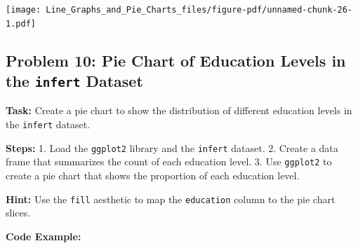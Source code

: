 \documentclass[
  letterpaper,
  DIV=11,
  numbers=noendperiod]{scrreprt}
\newenvironment{Shaded}{\begin{snugshade}}{\end{snugshade}}
\newcommand{\AttributeTok}[1]{\textcolor[rgb]{0.40,0.45,0.13}{#1}}
\newcommand{\CommentTok}[1]{\textcolor[rgb]{0.37,0.37,0.37}{#1}}
\newcommand{\DecValTok}[1]{\textcolor[rgb]{0.68,0.00,0.00}{#1}}
\newcommand{\FloatTok}[1]{\textcolor[rgb]{0.68,0.00,0.00}{#1}}
\newcommand{\FunctionTok}[1]{\textcolor[rgb]{0.28,0.35,0.67}{#1}}
\newcommand{\NormalTok}[1]{\textcolor[rgb]{0.00,0.23,0.31}{#1}}
\newcommand{\OtherTok}[1]{\textcolor[rgb]{0.00,0.23,0.31}{#1}}
\newcommand{\SpecialCharTok}[1]{\textcolor[rgb]{0.37,0.37,0.37}{#1}}
\newcommand{\StringTok}[1]{\textcolor[rgb]{0.13,0.47,0.30}{#1}}
\begin{document}
\texttt{[image: Line\_Graphs\_and\_Pie\_Charts\_files/figure-pdf/unnamed-chunk-26-1.pdf]}

\subsection*{\texorpdfstring{Problem 10: Pie Chart of Education Levels
in the \texttt{infert}
Dataset}{Problem 10: Pie Chart of Education Levels in the infert Dataset}}\label{problem-10-pie-chart-of-education-levels-in-the-infert-dataset}

\textbf{Task:} Create a pie chart to show the distribution of different
education levels in the \texttt{infert} dataset.

\textbf{Steps:} 1. Load the \texttt{ggplot2} library and the
\texttt{infert} dataset. 2. Create a data frame that summarizes the
count of each education level. 3. Use \texttt{ggplot2} to create a pie
chart that shows the proportion of each education level.

\textbf{Hint:} Use the \texttt{fill} aesthetic to map the
\texttt{education} column to the pie chart slices.

\textbf{Code Example:}

\begin{Shaded}
\end{Shaded}
\end{document}

